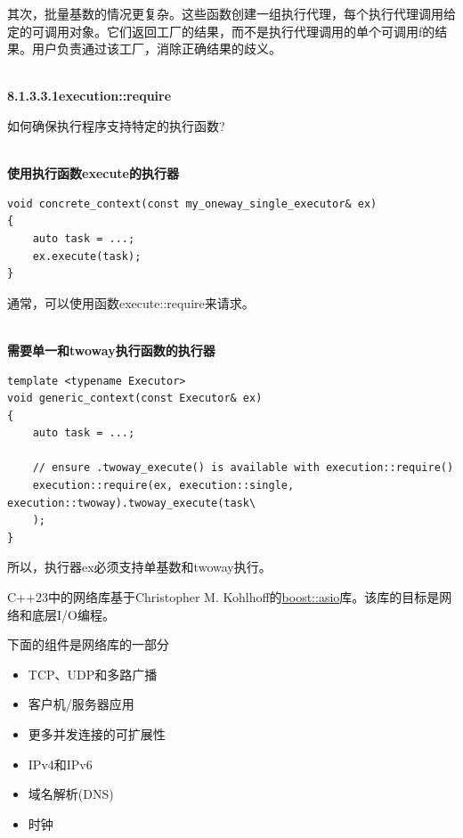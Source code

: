 其次，批量基数的情况更复杂。这些函数创建一组执行代理，每个执行代理调用给定的可调用对象。它们返回工厂的结果，而不是执行代理调用的单个可调用f的结果。用户负责通过该工厂，消除正确结果的歧义。

\hspace*{\fill} \\ %
\noindent
\textbf{8.1.3.3.1\hspace{0.2cm}execution::require}

如何确保执行程序支持特定的执行函数?

\hspace*{\fill} \\ %
\noindent
\textbf{使用执行函数execute的执行器}
\begin{lstlisting}[style=styleCXX]
void concrete_context(const my_oneway_single_executor& ex)
{
	auto task = ...;
	ex.execute(task);
}
\end{lstlisting}

通常，可以使用函数execute::require来请求。

\hspace*{\fill} \\ %
\noindent
\textbf{需要单一和twoway执行函数的执行器}
\begin{lstlisting}[style=styleCXX]
template <typename Executor>
void generic_context(const Executor& ex)
{
	auto task = ...;
	
	// ensure .twoway_execute() is available with execution::require()
	execution::require(ex, execution::single, execution::twoway).twoway_execute(task\
	);
}
\end{lstlisting}

所以，执行器ex必须支持单基数和twoway执行。


C++23中的网络库基于Christopher M. Kohlhoff的\href{https://www.boost.org/doc/libs/1_75_0/doc/html/boost_asio.html}{boost::asio}库。该库的目标是网络和底层I/O编程。

下面的组件是网络库的一部分

\begin{itemize}
\item 
TCP、UDP和多路广播

\item 
客户机/服务器应用

\item 
更多并发连接的可扩展性

\item 
IPv4和IPv6

\item 
域名解析(DNS)

\item 
时钟
\end{itemize}

